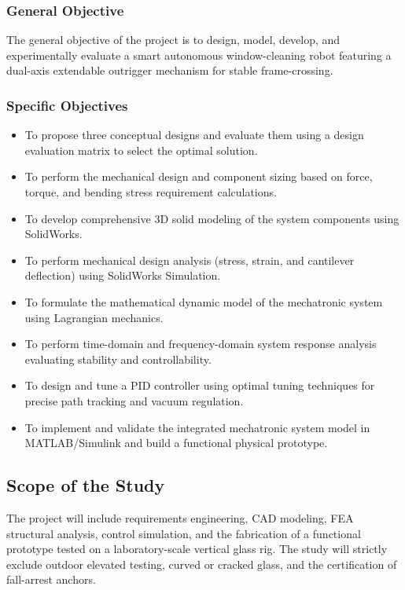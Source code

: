 \documentclass[12pt, a4paper]{article}
\begin{document}
\subsubsection{General Objective}
The general objective of the project is to design, model, develop, and experimentally evaluate a smart autonomous window-cleaning robot featuring a dual-axis extendable outrigger mechanism for stable frame-crossing.

\subsubsection{Specific Objectives}
\begin{itemize}
    \item To propose three conceptual designs and evaluate them using a design evaluation matrix to select the optimal solution.
    \item To perform the mechanical design and component sizing based on force, torque, and bending stress requirement calculations.
    \item To develop comprehensive 3D solid modeling of the system components using SolidWorks.
    \item To perform mechanical design analysis (stress, strain, and cantilever deflection) using SolidWorks Simulation.
    \item To formulate the mathematical dynamic model of the mechatronic system using Lagrangian mechanics.
    \item To perform time-domain and frequency-domain system response analysis evaluating stability and controllability.
    \item To design and tune a PID controller using optimal tuning techniques for precise path tracking and vacuum regulation.
    \item To implement and validate the integrated mechatronic system model in MATLAB/Simulink and build a functional physical prototype.
\end{itemize}

\subsection{Scope of the Study}
The project will include requirements engineering, CAD modeling, FEA structural analysis, control simulation, and the fabrication of a functional prototype tested on a laboratory-scale vertical glass rig. The study will strictly exclude outdoor elevated testing, curved or cracked glass, and the certification of fall-arrest anchors. 
\end{document}
